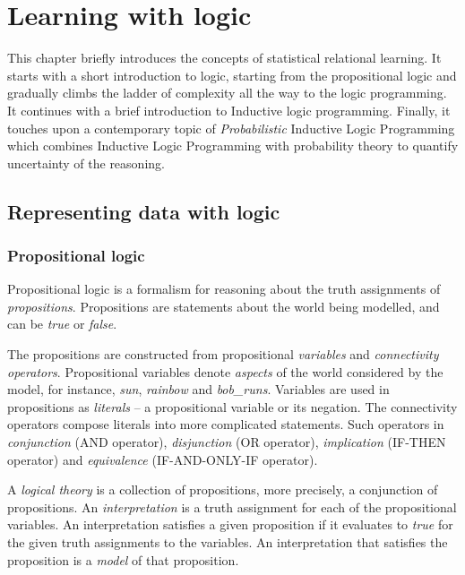 \chapter{Learning with logic}\label{ch:learninglogic}



This chapter briefly introduces the concepts of statistical relational learning.
It starts with a short introduction to logic, starting from the propositional logic and gradually climbs the ladder of complexity all the way to the logic programming.
It continues with a brief introduction to Inductive logic programming.
Finally, it touches upon a contemporary topic of \textit{Probabilistic} Inductive Logic Programming which combines Inductive Logic Programming  with probability theory to quantify uncertainty of the reasoning.




\section{Representing data with logic}





\subsection{Propositional logic}

Propositional logic is a formalism for reasoning about the truth assignments of \textit{propositions}.
Propositions are statements about the world being modelled, and can be \textit{true} or \textit{false}.


The propositions are constructed from propositional \textit{variables} and \textit{connectivity operators}.
Propositional variables denote \textit{aspects} of the world considered by the model, for instance, \textit{sun}, \textit{rainbow} and \textit{bob\_runs}.
Variables are used in propositions as \textit{literals} -- a propositional variable or its negation.
The connectivity operators compose literals into more complicated statements.
Such operators in \textit{conjunction} (AND operator), \textit{disjunction} (OR operator), \textit{implication} (IF-THEN operator) and \textit{equivalence} (IF-AND-ONLY-IF	operator).


A \textit{logical theory} is a collection of propositions, more precisely, a conjunction of propositions.
An \textit{interpretation} is a truth assignment for each of the propositional variables.
An interpretation satisfies a given proposition if it evaluates to \textit{true} for the given truth assignments to the variables.
An interpretation that satisfies the proposition is a \textit{model} of that proposition.



